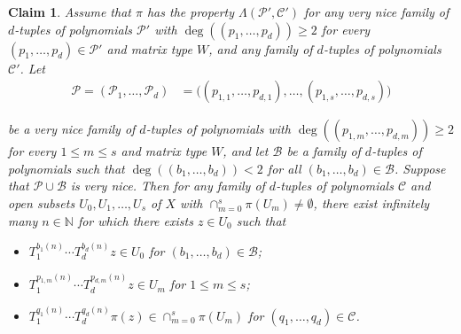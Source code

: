 \documentclass[10pt,a4paper]{amsart}
\newtheorem{claim}{Claim}
\newcommand{\N}{\mathbb{N}}
\newcommand{\cB}{{\mathcal B}}
\newcommand{\cC}{{\mathcal C}}
\newcommand{\cP}{{\mathcal P}}
\begin{document}
\begin{claim}\label{claim 1}
     Assume that $\pi$ has the property $\Lambda(\cP',\cC')$ for any very nice family of $d$-tuples of polynomials $\cP'$ with $\deg((p_1,\dots,p_d))\geq 2$ for every $(p_1,\dots,p_d)\in \cP'$ and matrix type $W$, and any family of $d$-tuples of polynomials $\cC'$. Let \begin{align*}
        \cP=(\cP_1,\dots,\cP_d) &= \big((p_{1,1},\dots,p_{d,1}),\dots,(p_{1,s},\dots,p_{d,s})\big)
    \end{align*}

     be a very nice family of $d$-tuples of polynomials with $\deg((p_{1,m},\dots,p_{d,m}))\geq 2$ for every $1\leq m\leq s$ and matrix type $W$, and let $\cB$ be a family of $d$-tuples of polynomials such that $\deg((b_1,\dots,b_d))<2$ for all $(b_1,\dots,b_d)\in\cB$. Suppose that $\cP\cup\cB$ is very nice. Then for any family of $d$-tuples of polynomials $\cC$ and open subsets $U_0,U_1,\dots,U_s$ of $X$ with $\cap_{m=0}^{s}\pi(U_m)\neq\emptyset$, there exist infinitely many $n\in \N$ for which there exists $z\in U_0$ such that\begin{itemize}
        \item $T_1^{b_1(n)}\cdots T_d^{b_d(n)}z\in U_0$ for $(b_1,\dots,b_d)\in \cB$;
        \item $T_1^{p_{1,m}(n)}\cdots T_d^{p_{d,m}(n)}z\in U_m$ for $1\leq m \leq s$;
        \item $T_1^{q_1(n)}\cdots T_d^{q_d(n)}\pi(z)\in \cap_{m=0}^{s}\pi(U_m)$ for $(q_1,\dots,q_d)\in \cC$.
    \end{itemize}
\end{claim}
\end{document}
